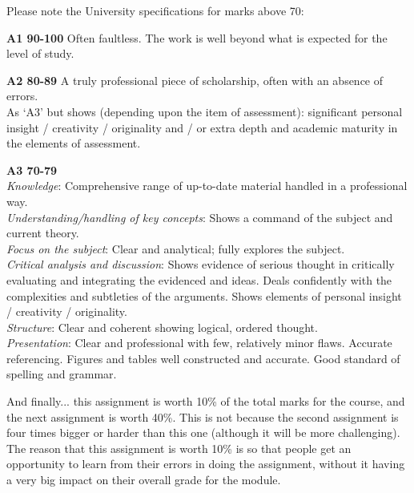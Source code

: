 \documentclass[11pt,]{article}
\begin{document}
Please note the University specifications for marks above 70:

{\bf A1 90-100}
Often faultless. The work is well beyond what is expected for the level of study.

{\bf A2 80-89}
A truly professional piece of scholarship, often with an absence of errors. \\
As `A3' but shows (depending upon the item of assessment):
significant personal insight / creativity / originality
and / or
extra depth and academic maturity in the elements of assessment.

{\bf A3 70-79}\\
\emph{Knowledge}: Comprehensive range of up-to-date material handled in a professional way.\\
\emph{Understanding/handling of key concepts}: Shows a command of the subject and current theory.\\
\emph{Focus on the subject}: Clear and analytical; fully explores the subject.\\
\emph{Critical analysis and discussion}: Shows evidence of serious thought in critically evaluating and integrating the evidenced and ideas. Deals confidently with the complexities and subtleties of the arguments. Shows elements of personal insight / creativity / originality.\\
\emph{Structure}: Clear and coherent showing logical, ordered thought.\\
\emph{Presentation}: Clear and professional with few, relatively minor flaws. Accurate referencing. Figures and tables well constructed and accurate. Good standard of spelling and grammar.


\bigskip
And finally...  this assignment is worth 10\% of the total marks for the course, and the next assignment is worth 40\%.  This is not because the second assignment is four times bigger or harder than this one (although it will be more challenging).  The reason that this assignment is worth 10\% is so that people get an opportunity to learn from their errors in doing the assignment, without it having a very big impact on their overall grade for the module. 
\end{document}
